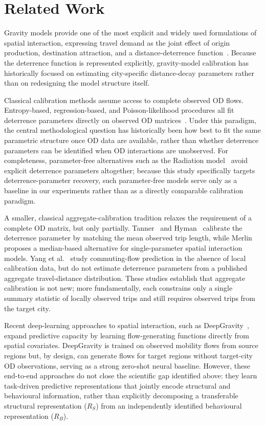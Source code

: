 \documentclass[pdflatex,sn-basic,iicol]{sn-jnl}
\begin{document}
\section{Related Work}\label{sec:related_work}

Gravity models provide one of the most explicit and widely used formulations of spatial interaction, expressing travel demand as the joint effect of origin production, destination attraction, and a distance-deterrence function~\citep{wilson1971,fotheringham1989spatial,sen1995gravity}. Because the deterrence function is represented explicitly, gravity-model calibration has historically focused on estimating city-specific distance-decay parameters rather than on redesigning the model structure itself.

Classical calibration methods assume access to complete observed OD flows. Entropy-based, regression-based, and Poisson-likelihood procedures all fit deterrence parameters directly on observed OD matrices~\citep{wilson1971,flowerdew1982method,lenormand2016systematic}. Under this paradigm, the central methodological question has historically been how best to fit the same parametric structure once OD data are available, rather than whether deterrence parameters can be identified when OD interactions are unobserved. For completeness, parameter-free alternatives such as the Radiation model~\citep{Simini2012universal} avoid explicit deterrence parameters altogether; because this study specifically targets deterrence-parameter recovery, such parameter-free models serve only as a baseline in our experiments rather than as a directly comparable calibration paradigm.

A smaller, classical aggregate-calibration tradition relaxes the requirement of a complete OD matrix, but only partially. Tanner~\citep{tanner1961} and Hyman~\citep{hyman1969calibration} calibrate the deterrence parameter by matching the mean observed trip length, while Merlin~\citep{merlin2020medians} proposes a median-based alternative for single-parameter spatial interaction models. Yang et al.~\citep{yang2014limits} study commuting-flow prediction in the absence of local calibration data, but do not estimate deterrence parameters from a published aggregate travel-distance distribution. These studies establish that aggregate calibration is not new; more fundamentally, each constrains only a single summary statistic of locally observed trips and still requires observed trips from the target city.

Recent deep-learning approaches to spatial interaction, such as DeepGravity~\citep{simini2021}, expand predictive capacity by learning flow-generating functions directly from spatial covariates. DeepGravity is trained on observed mobility flows from source regions but, by design, can generate flows for target regions without target-city OD observations, serving as a strong zero-shot neural baseline. However, these end-to-end approaches do not close the scientific gap identified above: they learn task-driven predictive representations that jointly encode structural and behavioural information, rather than explicitly decomposing a transferable structural representation ($R_S$) from an independently identified behavioural representation ($R_B$).
\end{document}

